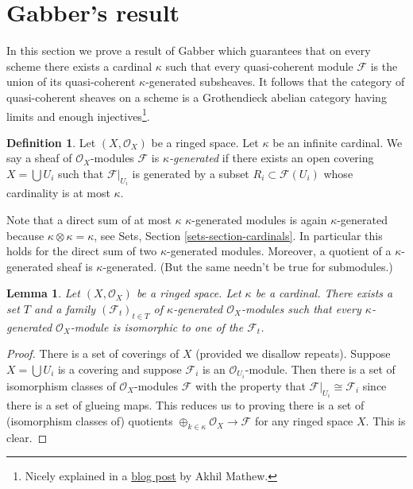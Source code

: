 \documentclass{stacks-project}
\theoremstyle{plain}
\newtheorem{lemma}[subsection]{Lemma}
\theoremstyle{definition}
\newtheorem{definition}[subsection]{Definition}
\theoremstyle{remark}
\numberwithin{equation}{subsection}
\begin{document}
\section{Gabber's result}
\label{section-gabber}

\noindent
In this section we prove a result of Gabber which guarantees that on every
scheme there exists a cardinal $\kappa$ such that every quasi-coherent
module $\mathcal{F}$ is the union of its quasi-coherent
$\kappa$-generated subsheaves. It follows that the category of quasi-coherent
sheaves on a scheme is a Grothendieck abelian category having
limits and enough injectives\footnote{Nicely explained in a
\href{https://amathew.wordpress.com/2011/07/30/quasi-coherent-sheaves-presentable-categories-and-a-result-of-gabber/}{blog post}
by Akhil Mathew.}.

\begin{definition}
\label{definition-kappa-generated}
Let $(X, \mathcal{O}_X)$ be a ringed space. Let $\kappa$ be an infinite
cardinal. We say a sheaf of $\mathcal{O}_X$-modules $\mathcal{F}$ is
{\it $\kappa$-generated} if there exists an open covering
$X = \bigcup U_i$ such that $\mathcal{F}|_{U_i}$ is generated by
a subset $R_i \subset \mathcal{F}(U_i)$ whose cardinality is
at most $\kappa$.
\end{definition}

\noindent
Note that a direct sum of at most $\kappa$ $\kappa$-generated modules is
again $\kappa$-generated because $\kappa \otimes \kappa = \kappa$, see
Sets, Section \ref{sets-section-cardinals}.
In particular this holds for the direct sum of two $\kappa$-generated modules.
Moreover, a quotient of a $\kappa$-generated sheaf is $\kappa$-generated.
(But the same needn't be true for submodules.)

\begin{lemma}
\label{lemma-set-of-iso-classes}
Let $(X, \mathcal{O}_X)$ be a ringed space. Let $\kappa$ be a cardinal.
There exists a set $T$ and a family $(\mathcal{F}_t)_{t \in T}$ of
$\kappa$-generated $\mathcal{O}_X$-modules such that every $\kappa$-generated
$\mathcal{O}_X$-module is isomorphic to one of the $\mathcal{F}_t$.
\end{lemma}

\begin{proof}
There is a set of coverings of $X$ (provided we disallow repeats).
Suppose $X = \bigcup U_i$ is a covering and suppose $\mathcal{F}_i$
is an $\mathcal{O}_{U_i}$-module. Then there is a set of isomorphism
classes of $\mathcal{O}_X$-modules $\mathcal{F}$ with the property
that $\mathcal{F}|_{U_i} \cong \mathcal{F}_i$ since there is a set of
glueing maps. This reduces us to proving there is a set of (isomorphism
classes of) quotients
$\oplus_{k \in \kappa} \mathcal{O}_X \to \mathcal{F}$
for any ringed space $X$. This is clear.
\end{proof}
\end{document}
